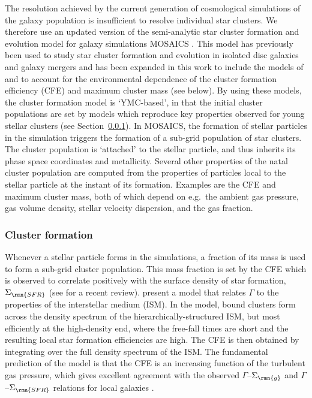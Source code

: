 \documentclass[fleqn,usenatbib]{mnras}
\begin{document}
The resolution achieved by the current generation of cosmological simulations of the galaxy population is insufficient to resolve individual star clusters. We therefore use an updated version of the semi-analytic star cluster formation and evolution model for galaxy simulations {\sc MOSAICS} \citep[MOdelling Star cluster population Assembly In Cosmological Simulations,][]{Kruijssen_and_Lamers_08, Kruijssen_09, Kruijssen_et_al_11}. This model has previously been used to study star cluster formation and evolution in isolated disc galaxies and galaxy mergers \citep{Kruijssen_et_al_11, Kruijssen_et_al_12} and has been expanded in this work to include the models of \citet{Kruijssen_12} and \citet{Reina-Campos_and_Kruijssen_17} to account for the environmental dependence of the cluster formation efficiency (CFE) and maximum cluster mass (see below). By using these models, the cluster formation model is `YMC-based', in that the initial cluster populations are set by models which reproduce key properties observed for young stellar clusters (see Section~\ref{sec:clform}).
In {\sc MOSAICS}, the formation of stellar particles in the simulation triggers the formation of a sub-grid population of star clusters. The cluster population is `attached' to the stellar particle, and thus inherits its phase space coordinates and metallicity. Several other properties of the natal cluster population are computed from the properties of particles local to the stellar particle at the instant of its formation. Examples are the CFE and maximum cluster mass, both of which depend on e.g.~the ambient gas pressure, gas volume density, stellar velocity dispersion, and the gas fraction.

\subsubsection{Cluster formation} \label{sec:clform}

Whenever a stellar particle forms in the simulations, a fraction of its mass is used to form a sub-grid cluster population. This mass fraction is set by the CFE \citep[$\Gamma$, i.e.~the fraction of star formation in bound clusters,][]{Bastian_08} which is observed to correlate positively with the surface density of star formation, $\Sigma_\rmn{SFR}$ (see \citealt{Adamo_and_Bastian_15} for a recent review). \citet{Kruijssen_12} present a model that relates $\Gamma$ to the properties of the interstellar medium (ISM). In the model, bound clusters form across the density spectrum of the hierarchically-structured ISM, but most efficiently at the high-density end, where the free-fall times are short and the resulting local star formation efficiencies are high. The CFE is then obtained by integrating over the full density spectrum of the ISM. The fundamental prediction of the model is that the CFE is an increasing function of the turbulent gas pressure, which gives excellent agreement with the observed $\Gamma$--$\Sigma_\rmn{g}$ and $\Gamma$--$\Sigma_\rmn{SFR}$ relations for local galaxies \citep{Kruijssen_12, Adamo_et_al_15, Johnson_et_al_16, Kruijssen_and_Bastian_16}.
\end{document}
